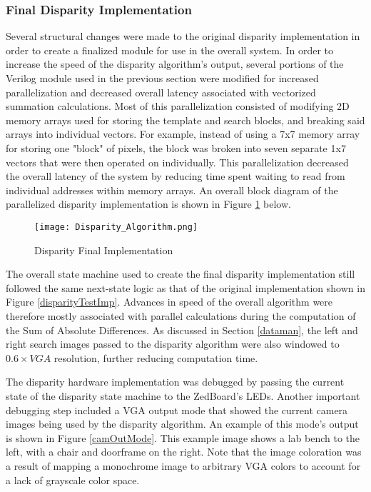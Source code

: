 \subsubsection{Final Disparity Implementation}
Several structural changes were made to the original disparity implementation in order to create a finalized module for use in the overall system. In order to increase the speed of the disparity algorithm's output, several portions of the Verilog module used in the previous section were modified for increased parallelization and decreased overall latency associated with vectorized summation calculations. Most of this parallelization consisted of modifying 2D memory arrays used for storing the template and search blocks, and breaking said arrays into individual vectors. For example, instead of using a 7x7 memory array for storing one "block" of pixels, the block was broken into seven separate 1x7 vectors that were then operated on individually. This parallelization decreased the overall latency of the system by reducing time spent waiting to read from individual addresses within memory arrays. An overall block diagram of the parallelized disparity implementation is shown in Figure \ref{disparityFinalImp} below. 
\par
\begin{figure}[H]
	\centerline{\texttt{[image: Disparity\_Algorithm.png]}}
	\caption{Disparity Final Implementation}
	\label{disparityFinalImp}
\end{figure}
\par
The overall state machine used to create the final disparity implementation still followed the same next-state logic as that of the original implementation shown in Figure \ref{disparityTestImp}. Advances in speed of the overall algorithm were therefore mostly associated with parallel calculations during the computation of the Sum of Absolute Differences. As discussed in Section \ref{dataman}, the left and right search images passed to the disparity algorithm were also windowed to $0.6\times{}VGA$ resolution, further reducing computation time. 
\par
The disparity hardware implementation was debugged by passing the current state of the disparity state machine to the ZedBoard's LEDs. Another important debugging step included a VGA output mode that showed the current camera images being used by the disparity algorithm. An example of this mode's output is shown in Figure \ref{camOutMode}. This example image shows a lab bench to the left, with a chair and doorframe on the right. Note that the image coloration was a result of mapping a monochrome image to arbitrary VGA colors to account for a lack of grayscale color space.
